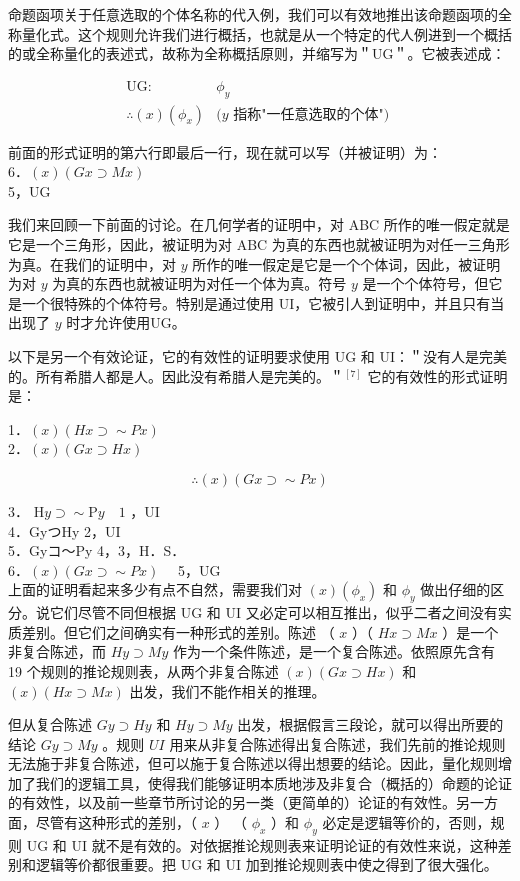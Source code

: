 命题函项关于任意选取的个体名称的代入例，我们可以有效地推出该命题函项的全称量化式。这个规则允许我们进行概括，也就是从一个特定的代人例进到一个概括的或全称量化的表述式，故称为全称概括原则，并缩写为＂UG＂。它被表述成：

$$
\begin{aligned}
\mathrm{UG}: & \phi_{y} \\
\therefore(x)\left(\phi_{x}\right) & (y \text { 指称"一任意选取的个体") }
\end{aligned}
$$

前面的形式证明的第六行即最后一行，现在就可以写（并被证明）为：\\
6．$(x)(G x \supset M x)$\\
5，UG

我们来回顾一下前面的讨论。在几何学者的证明中，对 ABC 所作的唯一假定就是它是一个三角形，因此，被证明为对 ABC 为真的东西也就被证明为对任一三角形为真。在我们的证明中，对 $y$ 所作的唯一假定是它是一个个体词，因此，被证明为对 $y$ 为真的东西也就被证明为对任一个体为真。符号 $y$ 是一个个体符号，但它是一个很特殊的个体符号。特别是通过使用 UI，它被引人到证明中，并且只有当出现了 $y$ 时才允许使用UG。

以下是另一个有效论证，它的有效性的证明要求使用 UG 和 UI：＂没有人是完美的。所有希腊人都是人。因此没有希腊人是完美的。＂${ }^{[7]}$ 它的有效性的形式证明是：

1．$(x)(H x \supset \sim P x)$\\
2．$(x)(G x \supset H x)$

$$
\therefore(x)(G x \supset \sim P x)
$$

3． $\mathrm{H} y \supset \sim \mathrm{P} y \quad 1$ ，UI\\
4．GyつHy 2，UI\\
5．Gyコ～Py 4，3，H．S．\\
6．$(x)(G x \supset \sim P x) \quad$ 5，UG\\
上面的证明看起来多少有点不自然，需要我们对 $(x)\left(\phi_{x}\right)$ 和 $\phi_{y}$ 做出仔细的区分。说它们尽管不同但根据 UG 和 UI 又必定可以相互推出，似乎二者之间没有实质差别。但它们之间确实有一种形式的差别。陈述 （ $x$ ）（ $H x \supset M x$ ）是一个非复合陈述，而 $H y \supset M y$ 作为一个条件陈述，是一个复合陈述。依照原先含有 19 个规则的推论规则表，从两个非复合陈述 $(x)(G x \supset H x)$ 和 $(x)(H x \supset M x)$ 出发，我们不能作相关的推理。

但从复合陈述 $G y \supset H y$ 和 $H y \supset M y$ 出发，根据假言三段论，就可以得出所要的结论 $G y \supset M y$ 。规则 $U I$ 用来从非复合陈述得出复合陈述，我们先前的推论规则无法施于非复合陈述，但可以施于复合陈述以得出想要的结论。因此，量化规则增加了我们的逻辑工具，使得我们能够证明本质地涉及非复合（概括的）命题的论证的有效性，以及前一些章节所讨论的另一类（更简单的）论证的有效性。另一方面，尽管有这种形式的差别，（ $x$ ） （ $\phi_{x}$ ）和 $\phi_{y}$ 必定是逻辑等价的，否则，规则 UG 和 UI 就不是有效的。对依据推论规则表来证明论证的有效性来说，这种差别和逻辑等价都很重要。把 UG 和 UI 加到推论规则表中使之得到了很大强化。

